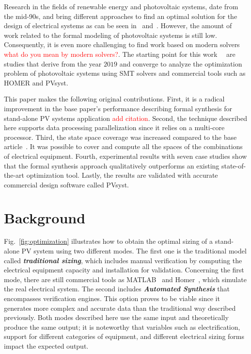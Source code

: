 \documentclass[10pt,journal,compsoc]{IEEEtran}
\begin{document}
Research in the fields of renewable energy and photovoltaic systems, date from the mid-90s, and bring different approaches to find an optimal solution for the design of electrical systems as can be seen in~\cite{Driouich2018} and~\cite{Applasamy2011}. However, the amount of work related to the formal modeling of photovoltaic systems is still low. Consequently, it is even more challenging to find work based on modern solvers \textcolor{red}{what do you mean by modern solvers?}. The starting point for this work~\cite{VSTTE2020}~\cite{TrindadeCordeiro19} are studies that derive from the year $2019$ and converge to analyze the optimization problem of photovoltaic systems using SMT solvers and commercial tools such as HOMER and PVsyst. 

This paper makes the following original contributions. First, it is a radical improvement in the base paper's performance describing formal synthesis for stand-alone PV systems application \textcolor{red}{add citation}. Second, the technique described here supports data processing parallelization since it relies on a multi-core processor. Third, the state space coverage was increased compared to the base article~\cite{VSTTE2020}. It was possible to cover and compute all the spaces of the combinations of electrical equipment. Fourth, experimental results with seven case studies show that the formal synthesis approach qualitatively outperforms an existing state-of-the-art optimization tool. Lastly, the results are validated with accurate commercial design software called PVsyst.

\section{Background}
\label{sec:AutomatedVerification}
 
Fig.~\ref{fig:optimization} illustrates how to obtain the optimal sizing of a stand-alone PV system using two different modes. The first one is the traditional model called \textit{\textbf{traditional sizing}}, which includes manual verification by computing the electrical equipment capacity and installation for validation. Concerning the first mode, there are still commercial tools as MATLAB~\cite{Benatiallah2017} and Homer~\cite{Pradhan,Swarnkar}, which simulate the real electrical system. The second includes \textbf{\textit{Automated Synthesis}} that encompasses verification engines. This option proves to be viable since it generates more complex and accurate data than the traditional way described previously. Both modes described here use the same input and theoretically produce the same output; it is noteworthy that variables such as electrification, support for different categories of equipment, and different electrical sizing forms impact the expected output.
\end{document}
